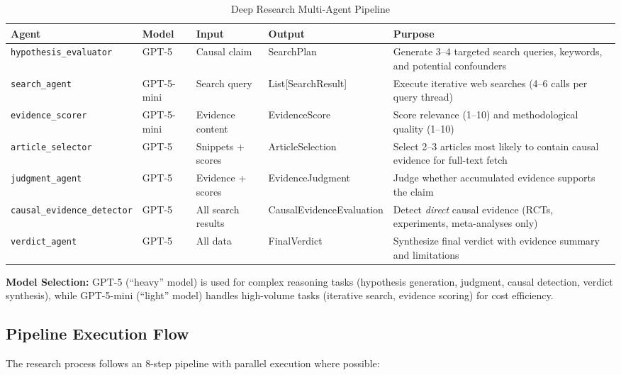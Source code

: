 \begin{table}[H]
\centering
\caption{Deep Research Multi-Agent Pipeline}
\label{tab:dr_agents}
\scriptsize
\renewcommand{\arraystretch}{1.1}
\begin{tabularx}{\textwidth}{@{}l l l l X@{}}
\toprule
\textbf{Agent} & \textbf{Model} & \textbf{Input} & \textbf{Output} & \textbf{Purpose} \\
\midrule
\texttt{hypothesis\_evaluator} & GPT-5 & Causal claim & SearchPlan & Generate 3--4 targeted search queries, keywords, and potential confounders \\
\texttt{search\_agent} & GPT-5-mini & Search query & List[SearchResult] & Execute iterative web searches (4--6 calls per query thread) \\
\texttt{evidence\_scorer} & GPT-5-mini & Evidence content & EvidenceScore & Score relevance (1--10) and methodological quality (1--10) \\
\texttt{article\_selector} & GPT-5 & Snippets + scores & ArticleSelection & Select 2--3 articles most likely to contain causal evidence for full-text fetch \\
\texttt{judgment\_agent} & GPT-5 & Evidence + scores & EvidenceJudgment & Judge whether accumulated evidence supports the claim \\
\texttt{causal\_evidence\_detector} & GPT-5 & All search results & CausalEvidenceEvaluation & Detect \textit{direct} causal evidence (RCTs, experiments, meta-analyses only) \\
\texttt{verdict\_agent} & GPT-5 & All data & FinalVerdict & Synthesize final verdict with evidence summary and limitations \\
\bottomrule
\end{tabularx}
\end{table}

\textbf{Model Selection:} GPT-5 (``heavy'' model) is used for complex reasoning tasks (hypothesis generation, judgment, causal detection, verdict synthesis), while GPT-5-mini (``light'' model) handles high-volume tasks (iterative search, evidence scoring) for cost efficiency.

\subsection{Pipeline Execution Flow}

The research process follows an 8-step pipeline with parallel execution where possible:

